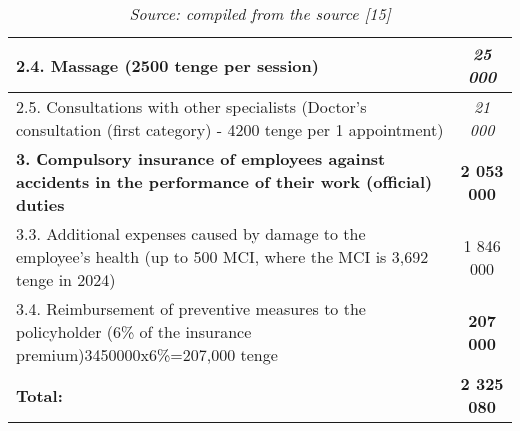 \begin{table}[H]
\begin{tabular}{|p{}|c|}
2.4. Massage (2500 tenge per session)                                                                                    & \textit{25 000}    \\ \hline
2.5. Consultations with other specialists (Doctor's consultation (first category) - 4200 tenge per 1 appointment)        & \textit{21 000}    \\ \hline
\textbf{3. Сompulsory insurance of employees against accidents in the performance of their work (official) duties}                           & \textbf{2 053 000}  \\ \hline
3.3. Additional expenses caused by damage to the employee's health (up to 500 MCI, where the MCI is 3,692 tenge in 2024) & 1 846 000          \\ \hline
3.4. Reimbursement of preventive measures to the policyholder (6\% of the insurance premium)3450000x6\%=207,000 tenge    & \textbf{207 000}    \\ \hline
\textbf{Total:}                                                                                                          & \textbf{2 325 080} \\ \hline
\end{tabular}
\caption*{{\normalfont \emph{Source: compiled from the source [15]}}}
\end{table}

